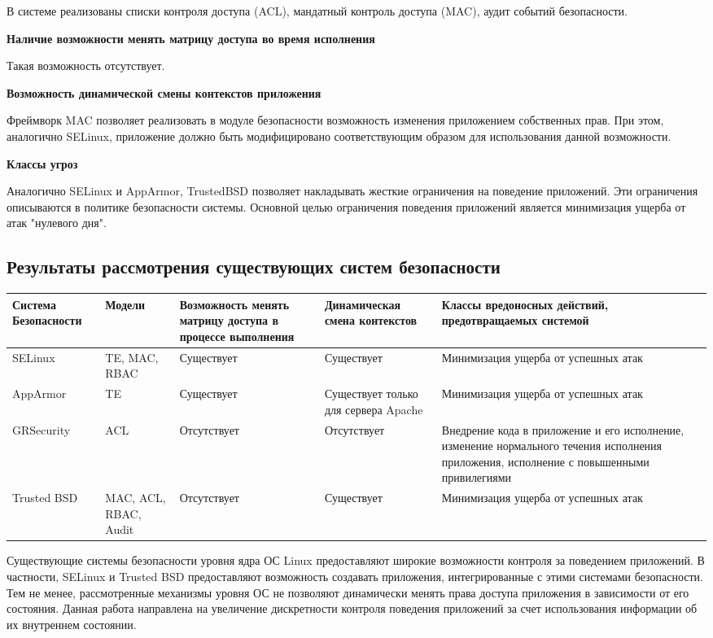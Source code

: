 В системе реализованы списки контроля доступа (ACL), 
мандатный контроль доступа (MAC), аудит событий
безопасности. 

\bigskip
{\bfseries Наличие возможности менять матрицу доступа 
	 во время исполнения } 
	 
Такая возможность отсутствует. 

\bigskip  
{\bfseries Возможность динамической смены контекстов приложения} 

Фреймворк MAC позволяет реализовать в модуле 
безопасности возможность изменения приложением 
собственных прав. При этом, аналогично SELinux, 
приложение должно быть модифицировано соответствующим 
образом для использования данной возможности. 

\bigskip
{\bfseries Классы угроз} 

Аналогично SELinux и AppArmor, TrustedBSD позволяет 
накладывать жесткие ограничения на поведение приложений. 
Эти ограничения описываются в политике безопасности системы.
Основной целью ограничения поведения приложений является 
минимизация ущерба от атак "нулевого дня". 

\subsection{Результаты рассмотрения существующих 
систем безопасности} 

\begin{scriptsize}
\bigskip
\begin{center}
\begin{tabular}{|p{2cm}|p{2.5cm}|p{3cm}|p{3cm}|p{3cm}|} 
\hline
Система Безопасности & Модели & Возможность менять матрицу 
доступа в процессе выполнения & 
Динамическая смена контекстов & Классы вредоносных действий,
предотвращаемых системой \\
\hline 
SELinux & TE, MAC, RBAC & Существует & Существует & 
Минимизация ущерба от успешных атак \\
\hline
AppArmor & TE & Существует & Существует только для сервера Apache & 
Минимизация ущерба от успешных атак \\ 
\hline 
GRSecurity & ACL & Отсутствует & Отсутствует & Внедрение кода в приложение 
и его исполнение, изменение нормального течения исполнения приложения, 
исполнение с повышенными привилегиями \\ 
\hline 
Trusted BSD & MAC, ACL, RBAC, Audit & Отсутствует & Существует & 
Минимизация ущерба от успешных атак \\ 
\hline
\end{tabular} 
\end{center} 
\end{scriptsize} 


\bigskip
Существующие системы безопасности уровня ядра ОС Linux 
предоставляют широкие возможности контроля за поведением 
приложений. В частности, SELinux и Trusted BSD 
 предоставляют возможность 
создавать приложения, интегрированные с этими системами 
безопасности. Тем не менее, рассмотренные механизмы уровня 
ОС не позволяют динамически менять права доступа приложения 
в зависимости от его состояния. Данная работа направлена на 
увеличение дискретности контроля поведения приложений за счет 
использования информации об их внутреннем состоянии. 
\bigskip
